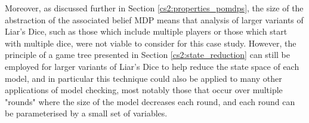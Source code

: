 Moreover, as discussed further in Section \ref{cs2:properties_pomdps}, the size of the abstraction of the associated belief MDP means that analysis of larger variants of Liar's Dice, such as those which include multiple players or those which start with multiple dice, were not viable to consider for this case study. However, the principle of a game tree presented in Section \ref{cs2:state_reduction} can still be employed for larger variants of Liar's Dice to help reduce the state space of each model, and in particular this technique could also be applied to many other applications of model checking, most notably those that occur over multiple "rounds" where the size of the model decreases each round, and each round can be parameterised by a small set of variables.

